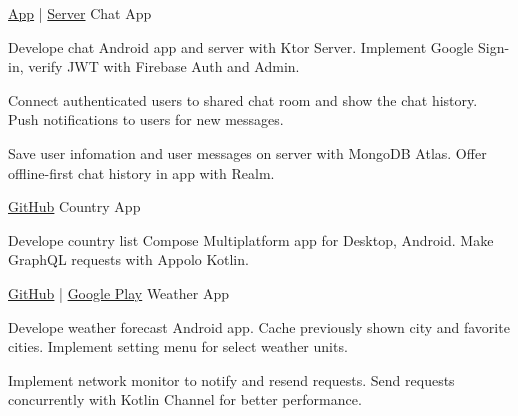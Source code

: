 \begin{cventries}
  \cventry
  {\href{https://github.com/nero240399/firebase-auth-chat-app}{App} | \href{https://github.com/nero240399/firebase-auth-chat-server}{Server}}
  {Chat App}
  {}
  {}
  {
    \begin{cvitems}
      \item {
      Develope chat Android app and server with Ktor Server.
      Implement Google Sign-in, verify JWT with Firebase Auth and Admin.
      }
      \item {
      Connect authenticated users to shared chat room and show the chat history.
      Push notifications to users for new messages.
      }
      \item {
      Save user infomation and user messages on server with MongoDB Atlas.
      Offer offline-first chat history in app with Realm.
      }
    \end{cvitems}        
  }
  
  \cventry
  {\href{https://github.com/nero240399/kmp-graphql-country-app}{GitHub}}
  {Country App}
  {}
  {}
  {
    \begin{cvitems}
      \item {
        Develope country list Compose Multiplatform app for Desktop, Android.
        Make GraphQL requests with Appolo Kotlin.
      }
    \end{cvitems}        
  }
  
  \cventry
  {\href{https://github.com/nero240399/clean-architecture-weather-app}{GitHub} | \href{https://play.google.com/store/apps/details?id=com.nero.weatherjourney}{Google Play}}
  {Weather App}
  {}
  {}
  {
    \begin{cvitems}
      \item {
      Develope weather forecast Android app.
      Cache previously shown city and favorite cities.
      Implement setting menu for select weather units.
      }
      \item {
      Implement network monitor to notify and resend requests.
      Send requests concurrently with Kotlin Channel for better performance.
      }
    \end{cvitems}        
  }
\end{cventries}
